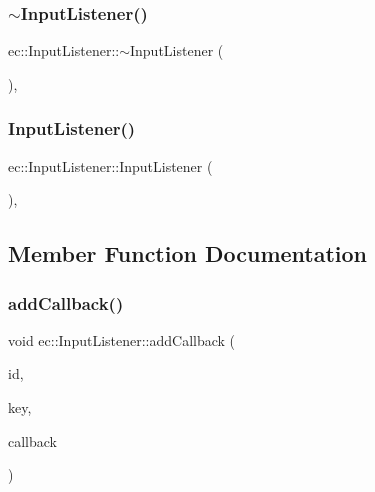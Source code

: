 \subsubsection{\texorpdfstring{$\sim$\+Input\+Listener()}{~InputListener()}}
{\footnotesize\ttfamily ec\+::\+Input\+Listener\+::$\sim$\+Input\+Listener (\begin{DoxyParamCaption}{ }\end{DoxyParamCaption})\hspace{0.3cm}{\ttfamily [virtual]}, {\ttfamily [default]}}

\mbox{\label{classec_1_1_input_listener_aa44d25c2b2d3ef5e72611831fd66e10c}} 
\subsubsection{\texorpdfstring{Input\+Listener()}{InputListener()}}
{\footnotesize\ttfamily ec\+::\+Input\+Listener\+::\+Input\+Listener (\begin{DoxyParamCaption}{ }\end{DoxyParamCaption})\hspace{0.3cm}{\ttfamily [explicit]}, {\ttfamily [protected]}}



\subsection{Member Function Documentation}
\mbox{\label{classec_1_1_input_listener_a9d43ca3fbda2db5809b29d7f237d41c4}} 
\subsubsection{\texorpdfstring{add\+Callback()}{addCallback()}}
{\footnotesize\ttfamily void ec\+::\+Input\+Listener\+::add\+Callback (\begin{DoxyParamCaption}\item[{const std\+::string \&}]{id,  }\item[{\mbox{\hyperlink{classec_1_1_input_listener_af5dfb691564fa8e05fcf7f053e3c532b}{Event\+Key\+\_\+\+Type}}}]{key,  }\item[{std\+::function$<$ void()$>$}]{callback }\end{DoxyParamCaption})}

